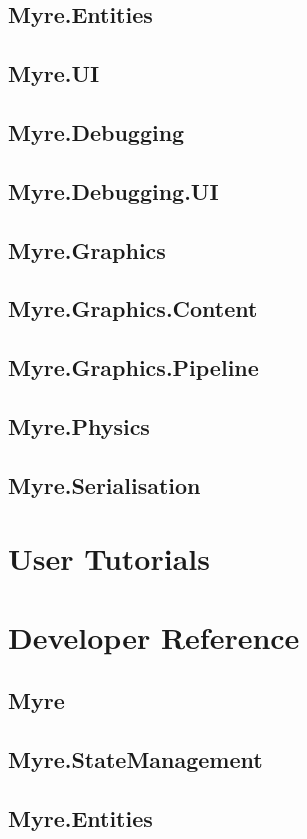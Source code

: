 \documentclass{article}
\begin{document}
\subsection{Myre.Entities}
\subsection{Myre.UI}
\subsection{Myre.Debugging}
\subsection{Myre.Debugging.UI}
\subsection{Myre.Graphics}
\subsection{Myre.Graphics.Content}
\subsection{Myre.Graphics.Pipeline}
\subsection{Myre.Physics}
\subsection{Myre.Serialisation}

\section{User Tutorials}

\section{Developer Reference}
\subsection{Myre}
\subsection{Myre.StateManagement}
\subsection{Myre.Entities}
\end{document}
